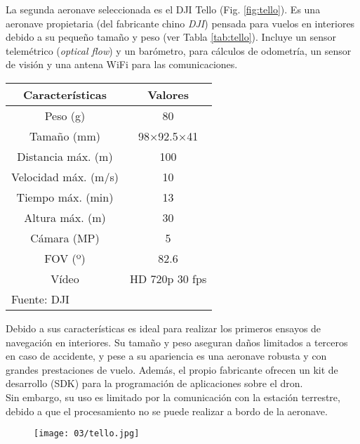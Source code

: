 \documentclass[../main.tex]{subfiles}
\begin{document}
La segunda aeronave seleccionada es el DJI Tello (Fig. \ref{fig:tello}). Es una aeronave propietaria (del fabricante chino \emph{DJI}) pensada para vuelos en interiores debido a su pequeño tamaño y peso (ver Tabla \ref{tab:tello}). Incluye un sensor telemétrico (\emph{optical flow}) y un barómetro, para cálculos de odometría, un sensor de visión y una antena WiFi para las comunicaciones. 

\begin{table}[H]
	{\begin{tabular}{|c|c|}
		\hline
		\textbf{Características} & \textbf{Valores} \\
		\hline
		Peso (g)             & 80 \\
		\hline
        Tamaño (mm)          & 98×92.5×41 \\
        \hline
        Distancia máx. (m)   & 100 \\
        \hline
        Velocidad máx. (m/s) & 10 \\
        \hline
        Tiempo máx. (min)    & 13 \\
        \hline
        Altura máx. (m)      & 30 \\
        \hline
        Cámara (MP)          & 5 \\
        \hline
        FOV (º)              & 82.6 \\
        \hline
        Vídeo                & HD 720p 30 fps \\
        \hline
		\multicolumn{2}{l}{Fuente: DJI}
	\end{tabular}}
\end{table}

Debido a sus características es ideal para realizar los primeros ensayos de navegación en interiores. Su tamaño y peso aseguran daños limitados a terceros en caso de accidente, y pese a su apariencia es una aeronave robusta y con grandes prestaciones de vuelo. Además, el propio fabricante ofrecen un kit de desarrollo (SDK) para la programación de aplicaciones sobre el dron. \\
Sin embargo, su uso es limitado por la comunicación con la estación terrestre, debido a que el procesamiento no se puede realizar a bordo de la aeronave.  

\begin{figure}[!ht]
 	{\texttt{[image: 03/tello.jpg]}}
\end{figure}
\end{document}
